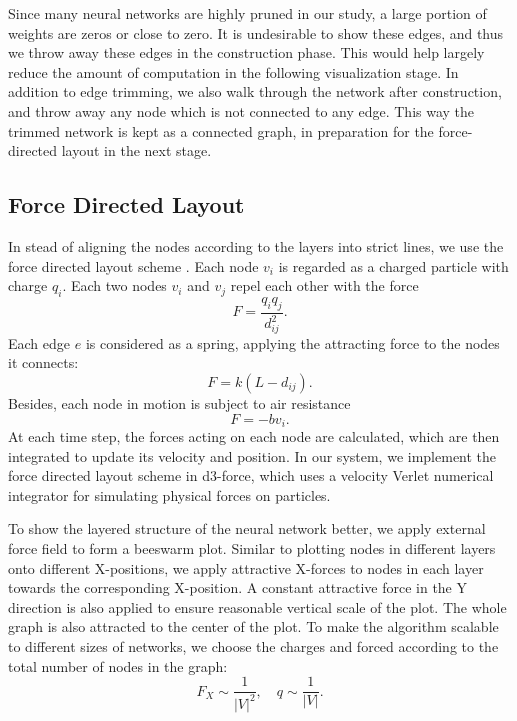\documentclass[sigchi]{acmart}
\begin{document}
Since many neural networks are highly pruned in our study, a large portion of weights are zeros or close to zero. It is undesirable to show these edges, and thus we throw away these edges in the construction phase. This would help largely reduce the amount of computation in the following visualization stage. In addition to edge trimming, we also walk through the network after construction, and throw away any node which is not connected to any edge. This way the trimmed network is kept as a connected graph, in preparation for the force-directed layout in the next stage.

\subsection{Force Directed Layout}
In stead of aligning the nodes according to the layers into strict lines, we use the force directed layout scheme \citep{fruchterman1991graph}. Each node $v_i$ is regarded as a charged particle with charge $q_i$. Each two nodes $v_i$ and $v_j$ repel each other with the force
\[
F = \frac{q_i q_j}{d_{ij}^2}.
\]
Each edge $e$ is considered as a spring, applying the attracting force to the nodes it connects:
\[
F = k(L - d_{ij}).
\]
Besides, each node in motion is subject to air resistance
\[
F = -b v_i.
\]
At each time step, the forces acting on each node are calculated, which are then integrated to update its velocity and position. In our system, we implement the force directed layout scheme in d3-force, which uses a velocity Verlet numerical integrator for simulating physical forces on particles. 

To show the layered structure of the neural network better, we apply external force field to form a beeswarm plot. Similar to plotting nodes in different layers onto different X-positions, we apply attractive X-forces to nodes in each layer towards the corresponding X-position. A constant attractive force in the Y direction is also applied to ensure reasonable vertical scale of the plot. The whole graph is also attracted to the center of the plot. To make the algorithm scalable to different sizes of networks, we choose the charges and forced according to the total number of nodes in the graph:
\[
F_X \sim \frac{1}{|V|^2}, \quad q \sim \frac{1}{|V|}.
\]
\end{document}
